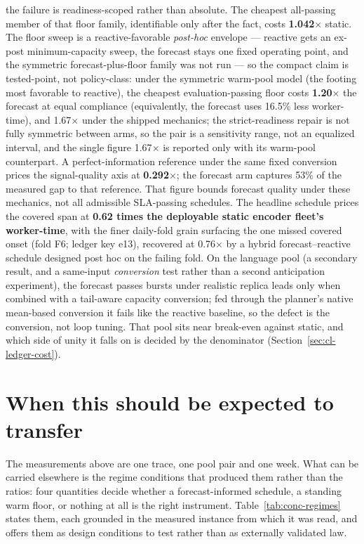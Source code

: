 the failure is readiness-scoped rather than absolute. The cheapest
all-passing member of that floor family, identifiable only after the fact, costs
\textbf{1.042$\times$} static. The floor sweep is a reactive-favorable
\emph{post-hoc} envelope --- reactive gets an ex-post minimum-capacity sweep,
the forecast stays one fixed operating point, and the symmetric
forecast-plus-floor family was not run --- so the compact claim is
tested-point, not policy-class: under the symmetric warm-pool model (the
footing most favorable to reactive), the cheapest evaluation-passing floor
costs \textbf{1.20$\times$} the forecast at equal compliance (equivalently,
the forecast uses 16.5\% less worker-time), and 1.67$\times$ under the shipped mechanics;
the strict-readiness repair is not fully symmetric between arms, so the pair
is a sensitivity range, not an equalized interval, and the single figure
1.67$\times$ is reported only with its warm-pool counterpart.
A perfect-information reference under the same fixed conversion prices the
signal-quality axis at \textbf{0.292$\times$}; the forecast arm captures
53\% of the measured gap to that reference. That figure bounds forecast
quality under these mechanics, not all admissible SLA-passing schedules.
The headline schedule prices the covered span at \textbf{0.62 times
the deployable static encoder fleet's worker-time}, with the finer
daily-fold grain surfacing the one missed covered onset (fold F6; ledger key
e13), recovered at
0.76$\times$ by a hybrid forecast--reactive schedule designed post hoc on
the failing fold. On the language pool (a secondary result, and a same-input
\emph{conversion} test rather than a second anticipation experiment), the
forecast passes bursts under realistic replica leads only
when combined with a tail-aware capacity conversion; fed through the
planner's native mean-based conversion it fails like the reactive baseline,
so the defect is the conversion, not loop tuning. That pool sits near
break-even against static, and which side of unity it falls on is decided by
the denominator (Section~\ref{sec:cl-ledger-cost}).

\section{When this should be expected to transfer}
\label{sec:conc-regimes}

The measurements above are one trace, one pool pair and one week. What can
be carried elsewhere is the regime conditions that produced them rather than
the ratios: four quantities decide whether a forecast-informed schedule,
a standing warm floor, or nothing at all is the right instrument.
Table~\ref{tab:conc-regimes} states them, each grounded in the measured
instance from which it was read, and offers them as design conditions to
test rather than as externally validated law.

